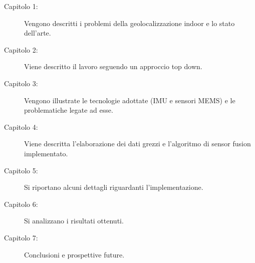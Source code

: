 \begin{description}
\item [Capitolo 1:] Vengono descritti i problemi della geolocalizzazione indoor e lo stato dell'arte.
\item [Capitolo 2:] Viene descritto il lavoro seguendo un approccio top down.
\item [Capitolo 3:] Vengono illustrate le tecnologie adottate (IMU e sensori MEMS) e le problematiche legate ad esse.
\item [Capitolo 4:] Viene descritta l'elaborazione dei dati grezzi e l'algoritmo di sensor fusion implementato.
\item [Capitolo 5:] Si riportano alcuni dettagli riguardanti l'implementazione.
\item [Capitolo 6:] Si analizzano i risultati ottenuti.
\item [Capitolo 7:] Conclusioni e prospettive future.
\end{description}